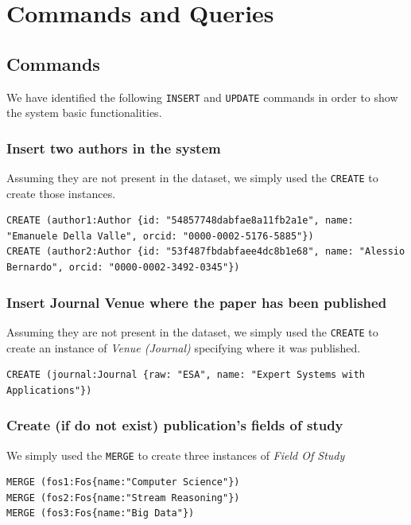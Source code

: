 \documentclass{Configuration_Files/PoliMi3i_thesis}
\begin{document}
\chapter{Commands and Queries}
\section{Commands}
We have identified the following \verb |INSERT| and \verb |UPDATE| commands in order to show the system basic functionalities.

\subsection{Insert two authors in the system}
Assuming they are not present in the dataset, we simply used the \verb |CREATE| to create those instances.
\begin{lstlisting}[language=cypher, label=lst:cypher-example]
CREATE (author1:Author {id: "54857748dabfae8a11fb2a1e", name: "Emanuele Della Valle", orcid: "0000-0002-5176-5885"})
CREATE (author2:Author {id: "53f487fbdabfaee4dc8b1e68", name: "Alessio Bernardo", orcid: "0000-0002-3492-0345"})
\end{lstlisting}

\subsection{Insert Journal Venue where the paper has been published}
Assuming they are not present in the dataset, we simply used the \verb |CREATE| to create an instance of \emph{Venue (Journal)}
specifying where it was published.
\begin{lstlisting}[language=cypher, label=lst:cypher-example]
CREATE (journal:Journal {raw: "ESA", name: "Expert Systems with Applications"})
\end{lstlisting}

\subsection{Create (if do not exist) publication's fields of study}
We simply used the \verb |MERGE| to create three instances of \emph{Field Of Study}
\begin{lstlisting}[language=cypher, label=lst:cypher-example]
MERGE (fos1:Fos{name:"Computer Science"})
MERGE (fos2:Fos{name:"Stream Reasoning"})
MERGE (fos3:Fos{name:"Big Data"})
\end{lstlisting}
\end{document}
